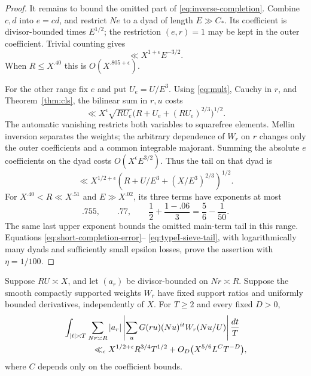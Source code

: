 \begin{proof}
It remains to bound the omitted part of \eqref{eq:inverse-completion}.
Combine $c,d$ into $e=cd$, and restrict $Ne$ to a dyad of length
$E\gg C_*$. Its coefficient is divisor-bounded times $E^{1/2}$;
the restriction $(e,r)=1$ may be kept in the outer coefficient.
Trivial counting gives
\begin{equation}
 \ll X^{1+\epsilon}E^{-3/2}.
 \label{eq:typeI-trivial-tail}
\end{equation}
When $R\le X^{.40}$ this is $O(X^{.805+\epsilon})$.

For the other range fix $e$ and put $U_e=U/E^3$.
Using \eqref{eq:mult}, Cauchy in $r$, and
Theorem~\ref{thm:cls}, the bilinear sum in $r,u$ costs
\[
 \ll X^\epsilon\sqrt{RU_e}
       \bigl(R+U_e+(RU_e)^{2/3}\bigr)^{1/2}.
\]
The automatic vanishing restricts both variables to squarefree elements.
Mellin inversion separates the weights; the arbitrary dependence of
$W_r$ on $r$ changes only the outer coefficients and a common
integrable majorant. Summing the absolute $e$ coefficients on the dyad
costs $O(X^\epsilon E^{3/2})$. Thus the tail on that dyad is
\begin{equation}
 \ll X^{1/2+\epsilon}
       \left(R+U/E^3+(X/E^3)^{2/3}\right)^{1/2}.
 \label{eq:typeI-sieve-tail}
\end{equation}
For $X^{.40}<R\ll X^{.51}$ and $E\gg X^{.02}$, its three terms
have exponents at most
\[
 .755,\qquad .77,\qquad
 \frac12+\frac{1-.06}{3}=\frac56-\frac1{50}.
\]
The same last upper exponent bounds the omitted main-term tail in
this range. Equations \eqref{eq:short-completion-error}--
\eqref{eq:typeI-sieve-tail}, with logarithmically many dyads and
sufficiently small epsilon losses, prove the assertion with
$\eta=1/100$.
\end{proof}

\begin{proposition}
\label{prop:typeIheight}
Suppose $RU\asymp X$, and let $(a_r)$ be divisor-bounded on
$Nr\asymp R$. Suppose the smooth compactly supported weights $W_r$
have fixed support ratios and uniformly bounded derivatives,
independently of $X$. For $T\ge2$ and every fixed $D>0$,
\begin{align}
 &\int_{|t|\asymp T}\sum_{Nr\asymp R}|a_r|
       \left|\sum_uG(ru)(Nu)^{it}W_r(Nu/U)\right|\frac{dt}{T}
 \notag\\
 &\hspace{12mm}\ll_\epsilon
       X^{1/2+\epsilon}R^{3/4}T^{1/2}
       +O_D\bigl(X^{5/6}L^{C}T^{-D}\bigr),
 \label{eq:typeI-height}
\end{align}
where $C$ depends only on the coefficient bounds.
\end{proposition}

